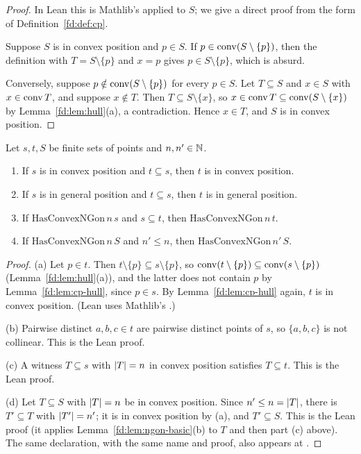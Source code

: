 \begin{proof}
In Lean this is Mathlib's  applied to $S$; we give
a direct proof from the form of Definition~\ref{fd:def:cp}.

Suppose $S$ is in convex position and $p\in S$. If $p\in\operatorname{conv}(S\setminus\{p\})$, then the definition with
$T=S\setminus\{p\}$ and $x=p$ gives $p\in S\setminus\{p\}$, which is absurd.

Conversely, suppose $p\notin\operatorname{conv}(S\setminus\{p\})$ for every $p\in S$. Let $T\subseteq S$ and $x\in S$
with $x\in\operatorname{conv} T$, and suppose $x\notin T$. Then $T\subseteq S\setminus\{x\}$, so
$x\in\operatorname{conv} T\subseteq\operatorname{conv}(S\setminus\{x\})$ by Lemma~\ref{fd:lem:hull}(a), a contradiction. Hence
$x\in T$, and $S$ is in convex position.
\end{proof}

\begin{lemma}\label{fd:lem:mono}\sloppy
Let $s,t,S$ be finite sets of points and $n,n'\in\mathbb N$.
\begin{enumerate}[label=(\alph*)]
\item If $s$ is in convex position and $t\subseteq s$, then $t$ is in convex position.
\item If $s$ is in general position and $t\subseteq s$, then $t$ is in general position.
\item If $\mathrm{HasConvexNGon}\,n\,s$ and $s\subseteq t$, then $\mathrm{HasConvexNGon}\,n\,t$.
\item If $\mathrm{HasConvexNGon}\,n\,S$ and $n'\le n$, then $\mathrm{HasConvexNGon}\,n'\,S$.
\end{enumerate}
\end{lemma}

\begin{proof}
(a) Let $p\in t$. Then $t\setminus\{p\}\subseteq s\setminus\{p\}$, so
$\operatorname{conv}(t\setminus\{p\})\subseteq\operatorname{conv}(s\setminus\{p\})$ (Lemma~\ref{fd:lem:hull}(a)), and the latter does
not contain $p$ by Lemma~\ref{fd:lem:cp-hull}, since $p\in s$. By Lemma~\ref{fd:lem:cp-hull} again, $t$ is
in convex position. (Lean uses Mathlib's .)

(b) Pairwise distinct $a,b,c\in t$ are pairwise distinct points of $s$, so $\{a,b,c\}$ is not collinear.
This is the Lean proof.

(c) A witness $T\subseteq s$ with $\lvert T\rvert=n$ in convex position satisfies $T\subseteq t$. This is the
Lean proof.

(d) Let $T\subseteq S$ with $\lvert T\rvert=n$ be in convex position. Since $n'\le n=\lvert T\rvert$, there is
$T'\subseteq T$ with $\lvert T'\rvert=n'$; it is in convex position by (a), and $T'\subseteq S$. This is the
Lean proof (it applies Lemma~\ref{fd:lem:ngon-basic}(b) to $T$ and then part (c) above). The same declaration, with the same name and
proof, also appears at .
\end{proof}

